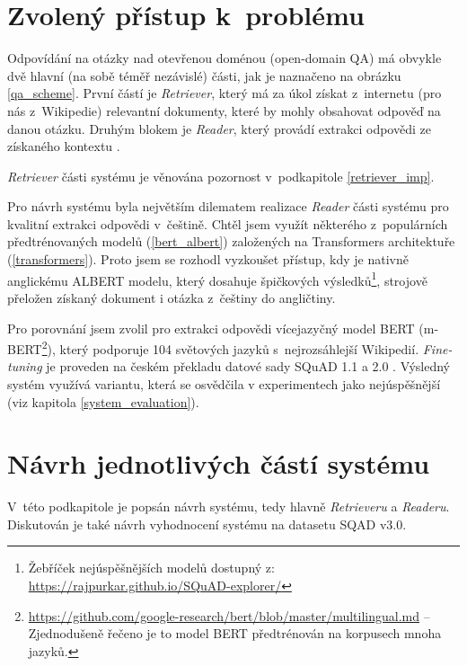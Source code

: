 \section{Zvolený přístup k~problému}
Odpovídání na otázky nad otevřenou doménou (open-domain QA) má obvykle dvě hlavní (na sobě téměř nezávislé) části, jak je naznačeno na obrázku \ref{qa_scheme}. První částí je \emph{Retriever}, který má za úkol získat z~internetu (pro nás z~Wikipedie) relevantní dokumenty, které by mohly obsahovat odpověď na danou otázku. Druhým blokem je \emph{Reader}, který provádí extrakci odpovědi ze získaného kontextu \cite{drQA}.\par
\noindent\emph{Retriever} části systému je věnována pozornost v~podkapitole \ref{retriever_imp}.\par
Pro návrh systému byla největším dilematem realizace \emph{Reader} části systému pro kvalitní extrakci odpovědi v~češtině. Chtěl jsem využít některého z~populárních předtrénovaných modelů (\ref{bert_albert}) založených na Transformers \cite{Transformers} architektuře (\ref{transformers}). Proto jsem se rozhodl vyzkoušet přístup, kdy je nativně anglickému ALBERT modelu, který dosahuje špičkových výsledků\footnote{Žebříček nejúspěšnějších modelů dostupný z: \url{https://rajpurkar.github.io/SQuAD-explorer/}}, strojově přeložen získaný dokument i otázka z~češtiny do angličtiny.\par
Pro porovnání jsem zvolil pro extrakci odpovědi vícejazyčný model BERT (m-BERT\footnote{\url{https://github.com/google-research/bert/blob/master/multilingual.md} -- Zjednodušeně řečeno je to model BERT předtrénován na korpusech mnoha jazyků.}), který podporuje 104 světových jazyků s~nejrozsáhlejší Wikipedií. \emph{Fine-tuning} je proveden na českém překladu datové sady SQuAD 1.1 a 2.0 \cite{czech_squad} \cite{squad}. Výsledný systém využívá variantu, která se osvědčila v experimentech jako nejúspěšnější (viz kapitola \ref{system_evaluation}).\par

\section{Návrh jednotlivých částí systému}
\label{design}
V~této podkapitole je popsán návrh systému, tedy hlavně \emph{Retrieveru} a \emph{Readeru}. Diskutován je také návrh vyhodnocení systému na datasetu SQAD v3.0.

